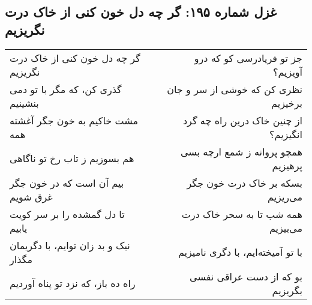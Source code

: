\begin{center}
\section*{غزل شماره ۱۹۵: گر چه دل خون کنی از خاک درت نگریزیم}
\label{sec:195}
\begin{longtable}{l p{0.5cm} r}
گر چه دل خون کنی از خاک درت نگریزیم
&&
جز تو فریادرسی کو که درو آویزیم؟
\\
گذری کن، که مگر با تو دمی بنشینیم
&&
نظری کن که خوشی از سر و جان برخیزیم
\\
مشت خاکیم به خون جگر آغشته همه
&&
از چنین خاک درین راه چه گرد انگیزیم؟
\\
هم بسوزیم ز تاب رخ تو ناگاهی
&&
همچو پروانه ز شمع ارچه بسی پرهیزیم
\\
بیم آن است که در خون جگر غرق شویم
&&
بسکه بر خاک درت خون جگر می‌ریزیم
\\
تا دل گمشده را بر سر کویت یابیم
&&
همه شب تا به سحر خاک درت می‌بیزیم
\\
نیک و بد زان توایم، با دگریمان مگذار
&&
با تو آمیخته‌ایم، با دگری نامیزیم
\\
راه ده باز، که نزد تو پناه آوردیم
&&
بو که از دست عراقی نفسی بگریزیم
\\
\end{longtable}
\end{center}
